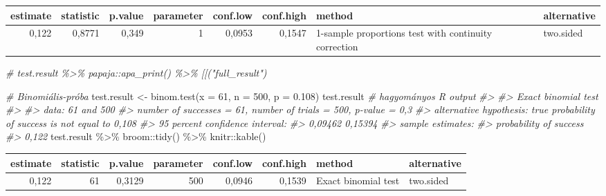 \documentclass[
]{book}
\newenvironment{Shaded}{\begin{snugshade}}{\end{snugshade}}
\newcommand{\AttributeTok}[1]{\textcolor[rgb]{0.77,0.63,0.00}{#1}}
\newcommand{\CommentTok}[1]{\textcolor[rgb]{0.56,0.35,0.01}{\textit{#1}}}
\newcommand{\DecValTok}[1]{\textcolor[rgb]{0.00,0.00,0.81}{#1}}
\newcommand{\FloatTok}[1]{\textcolor[rgb]{0.00,0.00,0.81}{#1}}
\newcommand{\FunctionTok}[1]{\textcolor[rgb]{0.00,0.00,0.00}{#1}}
\newcommand{\NormalTok}[1]{#1}
\newcommand{\OtherTok}[1]{\textcolor[rgb]{0.56,0.35,0.01}{#1}}
\newcommand{\SpecialCharTok}[1]{\textcolor[rgb]{0.00,0.00,0.00}{#1}}
\begin{document}
\begin{tabular}{r|r|r|r|r|r|l|l}
\hline
estimate & statistic & p.value & parameter & conf.low & conf.high & method & alternative\\
\hline
0,122 & 0,8771 & 0,349 & 1 & 0,0953 & 0,1547 & 1-sample proportions test with continuity correction & two.sided\\
\hline
\end{tabular}

\begin{Shaded}
\begin{Highlighting}[]
\CommentTok{\# test.result \%\textgreater{}\% papaja::apa\_print() \%\textgreater{}\% \textasciigrave{}[[\textasciigrave{}("full\_result")}

\CommentTok{\# Binomiális{-}próba}
\NormalTok{test.result }\OtherTok{\textless{}{-}} \FunctionTok{binom.test}\NormalTok{(}\AttributeTok{x =} \DecValTok{61}\NormalTok{, }\AttributeTok{n =} \DecValTok{500}\NormalTok{, }\AttributeTok{p =} \FloatTok{0.108}\NormalTok{)}
\NormalTok{test.result   }\CommentTok{\# hagyományos R output}
\CommentTok{\#\textgreater{} }
\CommentTok{\#\textgreater{}  Exact binomial test}
\CommentTok{\#\textgreater{} }
\CommentTok{\#\textgreater{} data:  61 and 500}
\CommentTok{\#\textgreater{} number of successes = 61, number of trials = 500, p{-}value = 0,3}
\CommentTok{\#\textgreater{} alternative hypothesis: true probability of success is not equal to 0,108}
\CommentTok{\#\textgreater{} 95 percent confidence interval:}
\CommentTok{\#\textgreater{}  0,09462 0,15394}
\CommentTok{\#\textgreater{} sample estimates:}
\CommentTok{\#\textgreater{} probability of success }
\CommentTok{\#\textgreater{}                  0,122}
\NormalTok{test.result }\SpecialCharTok{\%\textgreater{}\%}\NormalTok{ broom}\SpecialCharTok{::}\FunctionTok{tidy}\NormalTok{() }\SpecialCharTok{\%\textgreater{}\%}\NormalTok{ knitr}\SpecialCharTok{::}\FunctionTok{kable}\NormalTok{()}
\end{Highlighting}
\end{Shaded}

\begin{tabular}{r|r|r|r|r|r|l|l}
\hline
estimate & statistic & p.value & parameter & conf.low & conf.high & method & alternative\\
\hline
0,122 & 61 & 0,3129 & 500 & 0,0946 & 0,1539 & Exact binomial test & two.sided\\
\hline
\end{tabular}
\end{document}
